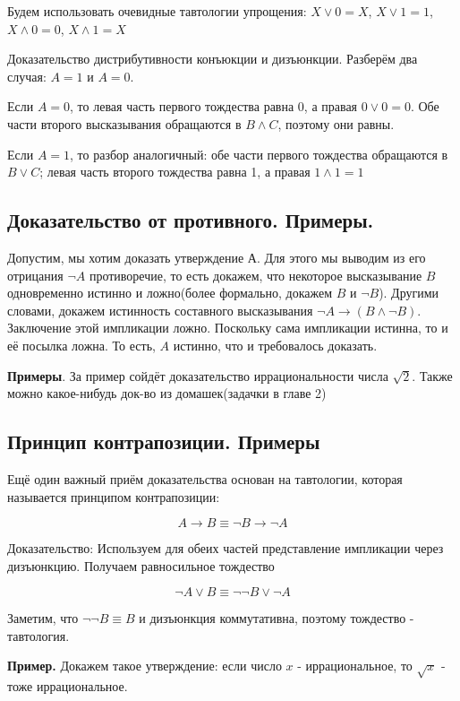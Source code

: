\documentclass[a4paper, 10pt]{article}
\begin{document}
Будем использовать очевидные тавтологии упрощения: $X \vee 0 = X$, $X \vee 1 = 1$, $X \wedge 0 = 0$, $X \wedge 1 = X$

Доказательство дистрибутивности конъюкции и дизъюнкции. Разберём два случая: $A = 1$ и $A = 0$.

Если $A = 0$, то левая часть первого тождества равна $0$, а правая $0 \vee 0 = 0$. Обе части второго высказывания обращаются в $B \wedge C$, поэтому они равны.

Если $A = 1$, то разбор аналогичный: обе части первого тождества обращаются в $B \vee C$; левая часть второго тождества равна 1, а правая $1 \wedge 1 = 1$


\subsection{Доказательство от противного. Примеры.}


Допустим, мы хотим доказать утверждение А. Для этого мы выводим из его отрицания $\neg A$ противоречие, то есть докажем, что некоторое высказывание $B$ одновременно истинно и ложно(более формально, докажем $B$ и $\neg B$). Другими словами, докажем истинность составного высказывания $\neg A \rightarrow (B \wedge \neg B)$. Заключение этой импликации ложно. Поскольку сама импликации истинна, то и её посылка ложна. То есть, $A$ истинно, что и требовалось доказать.

\textbf{Примеры}. За пример сойдёт доказательство иррациональности числа $\sqrt{2}$. Также можно какое-нибудь док-во из домашек(задачки в главе 2)

\subsection{Принцип контрапозиции. Примеры}

Ещё один важный приём доказательства основан на тавтологии, которая называется принципом контрапозиции:

$$A \rightarrow B \equiv \neg B \rightarrow \neg A$$

Доказательство: Используем для обеих частей представление импликации через дизъюнкцию. Получаем равносильное тождество

$$\neg A \vee B \equiv \neg \neg B \vee \neg A$$

Заметим, что $\neg \neg B \equiv B$ и дизъюнкция коммутативна, поэтому тождество - тавтология.

\textbf{Пример.} Докажем такое утверждение: если число $x$ - иррациональное, то $\sqrt{x}$ - тоже иррациональное.
\end{document}
